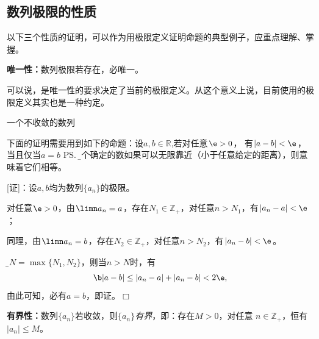 \subsection{数列极限的性质}

以下三个性质的证明，可以作为用极限定义证明命题的典型例子，应重点理解、掌握。

\begin{thx}
	{\bf 唯一性：}数列极限若存在，必唯一。
\end{thx}

可以说，是唯一性的要求决定了当前的极限定义。从这个意义上说，目前使用的极限定义其实也是一种约定。

\begin{center}
	
	一个不收敛的数列
\end{center}

下面的证明需要用到如下的命题：设$a,b\in\mathbb{R}$,若对任意$\e>0$，
有$|a-b|<\e$，当且仅当$a=b$
\ps{\b 两个确定的数如果可以无限靠近（小于任意给定的距离），则意味着它们相等。}

[证]：设$a,b$均为数列$\{a_n\}$的极限。

对任意$\e>0$，由$\limn a_n=a$，存在$N_1\in\mathbb{Z}_+$，对任意$n>N_1$，有$|a_n-a|<\e$；

同理，由$\limn a_n=b$，存在$N_2\in\mathbb{Z}_+$，对任意$n>N_2$，有$|a_n-b|<\e$。

令{\b $N=\max\{N_1,N_2\}$}，则当$n>N$时，有
$${\b |a-b|\leq|a_n-a|+|a_n-b|<2\e},$$
由此可知，必有$a=b$，即证。\hfill $\Box$

\begin{thx}
	{\bf 有界性：}数列$\{a_n\}$若收敛，则{\it $\{a_n\}$有界}，即：存在$M>0$，对任意
	$n\in\mathbb{Z}_+$，恒有$|a_n|\leq M$。	
\end{thx}

